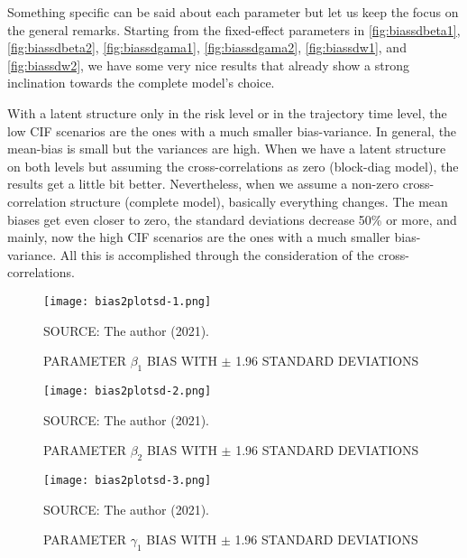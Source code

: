 Something specific can be said about each parameter but let us keep the
focus on the general remarks. Starting from the fixed-effect parameters
in \autoref{fig:biassdbeta1}, \autoref{fig:biassdbeta2},
\autoref{fig:biassdgama1}, \autoref{fig:biassdgama2},
\autoref{fig:biassdw1}, and \autoref{fig:biassdw2}, we have some very
nice results that already show a strong inclination towards the complete
model's choice.

With a latent structure only in the risk level or in the trajectory time
level, the low CIF scenarios are the ones with a much smaller
bias-variance. In general, the mean-bias is small but the variances are
high. When we have a latent structure on both levels but assuming the
cross-correlations as zero (block-diag model), the results get a little
bit better. Nevertheless, when we assume a non-zero cross-correlation
structure (complete model), basically everything changes. The mean
biases get even closer to zero, the standard deviations decrease 50\% or
more, and mainly, now the high CIF scenarios are the ones with a much
smaller bias-variance. All this is accomplished through the
consideration of the cross-correlations.

\begin{figure}[H]
 \setlength{\abovecaptionskip}{.0001pt}
 \caption{PARAMETER \(\beta_{1}\) BIAS WITH \(\pm\) 1.96 STANDARD
          DEVIATIONS}
 \vspace{0.2cm}\centering
 \texttt{[image: bias2plotsd-1.png]}\\
 \begin{footnotesize}
  SOURCE: The author (2021).
 \end{footnotesize}
 \label{fig:biassdbeta1}
\end{figure}

\begin{figure}[H]
 \setlength{\abovecaptionskip}{.0001pt}
 \caption{PARAMETER \(\beta_{2}\) BIAS WITH \(\pm\) 1.96 STANDARD
         DEVIATIONS}
 \vspace{0.2cm}\centering
 \texttt{[image: bias2plotsd-2.png]}\\
 \begin{footnotesize}
  SOURCE: The author (2021).
 \end{footnotesize}
 \label{fig:biassdbeta2}
\end{figure}

\begin{figure}[H]
 \setlength{\abovecaptionskip}{.0001pt}
 \caption{PARAMETER \(\gamma_{1}\) BIAS WITH \(\pm\) 1.96 STANDARD
          DEVIATIONS}
 \vspace{0.2cm}\centering
 \texttt{[image: bias2plotsd-3.png]}\\
 \begin{footnotesize}
  SOURCE: The author (2021).
 \end{footnotesize}
 \label{fig:biassdgama1}
\end{figure}

